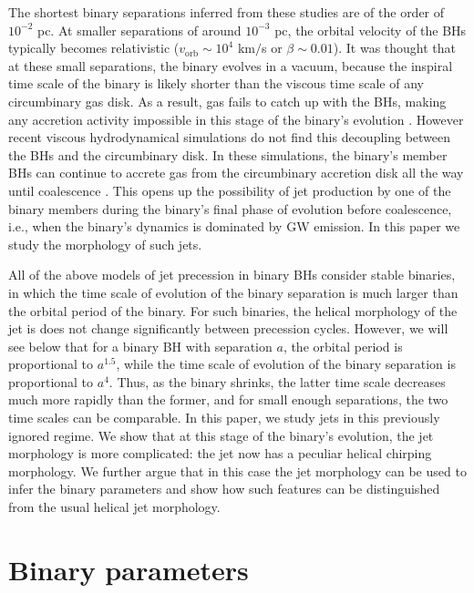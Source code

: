 \documentclass[a4paper,fleqn,usenatbib]{mnras}
\begin{document}
The shortest binary separations inferred from these studies are of the
order of $10^{-2}$ pc.  At smaller separations of around $10^{-3}$ pc,
the orbital velocity of the BHs typically becomes relativistic
($v_\mathrm{orb}\sim 10^4$ km$/$s or $\beta\sim 0.01$).  It was
thought that at these small separations, the binary evolves in a
vacuum, because the inspiral time scale of the binary is likely
shorter than the viscous time scale of any circumbinary gas disk.  As
a result, gas fails to catch up with the BHs, making any accretion
activity impossible in this stage of the binary's evolution
\citep{2005ApJ...622L..93M, 2010PhRvD..81b4019S, 2010ApJ...714..404T}.
However recent viscous hydrodynamical simulations do not find this
decoupling between the BHs and the circumbinary disk.  In these
simulations, the binary's member BHs can continue to accrete gas from
the circumbinary accretion disk all the way until coalescence
\citep{2012PhRvL.109v1102F, 2013MNRAS.436.2997D, 2014PhRvD..89f4060G,
  2014PhRvD..90j4030G, 2015MNRAS.446L..36F, 2015ApJ...807..131S}.
This opens up the possibility of jet production by one of the binary
members during the binary's final phase of evolution before
coalescence, i.e., when the binary's dynamics is dominated by GW
emission.  In this paper we study the morphology of such jets.

All of the above models of jet precession in binary BHs consider
stable binaries, in which the time scale of evolution of the binary
separation is much larger than the orbital period of the binary.  For
such binaries, the helical morphology of the jet is does not change
significantly between precession cycles.  However, we will see below
that for a binary BH with separation $a$, the orbital period is
proportional to $a^{1.5}$, while the time scale of evolution of the
binary separation is proportional to $a^{4}$.  Thus, as the binary
shrinks, the latter time scale decreases much more rapidly than the
former, and for small enough separations, the two time scales can be
comparable.  In this paper, we study jets in this previously ignored
regime.  We show that at this stage of the binary's evolution, the jet
morphology is more complicated: the jet now has a peculiar helical
chirping morphology.  We further argue that in this case the jet
morphology can be used to infer the binary parameters and show how
such features can be distinguished from the usual helical jet
morphology.

\section{Binary parameters}
\end{document}
